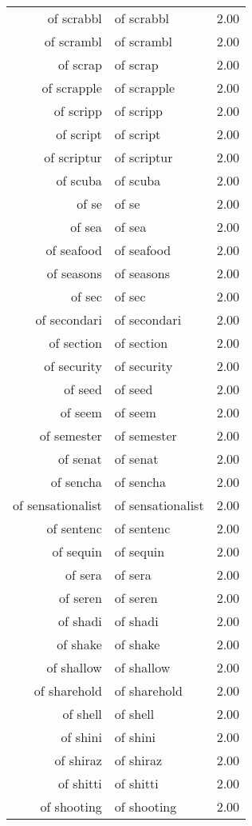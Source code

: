 \begin{table}[ht]
\begin{tabular}{rlr}
  of scrabbl & of scrabbl & 2.00 \\ 
  of scrambl & of scrambl & 2.00 \\ 
  of scrap & of scrap & 2.00 \\ 
  of scrapple & of scrapple & 2.00 \\ 
  of scripp & of scripp & 2.00 \\ 
  of script & of script & 2.00 \\ 
  of scriptur & of scriptur & 2.00 \\ 
  of scuba & of scuba & 2.00 \\ 
  of se & of se & 2.00 \\ 
  of sea & of sea & 2.00 \\ 
  of seafood & of seafood & 2.00 \\ 
  of seasons & of seasons & 2.00 \\ 
  of sec & of sec & 2.00 \\ 
  of secondari & of secondari & 2.00 \\ 
  of section & of section & 2.00 \\ 
  of security & of security & 2.00 \\ 
  of seed & of seed & 2.00 \\ 
  of seem & of seem & 2.00 \\ 
  of semester & of semester & 2.00 \\ 
  of senat & of senat & 2.00 \\ 
  of sencha & of sencha & 2.00 \\ 
  of sensationalist & of sensationalist & 2.00 \\ 
  of sentenc & of sentenc & 2.00 \\ 
  of sequin & of sequin & 2.00 \\ 
  of sera & of sera & 2.00 \\ 
  of seren & of seren & 2.00 \\ 
  of shadi & of shadi & 2.00 \\ 
  of shake & of shake & 2.00 \\ 
  of shallow & of shallow & 2.00 \\ 
  of sharehold & of sharehold & 2.00 \\ 
  of shell & of shell & 2.00 \\ 
  of shini & of shini & 2.00 \\ 
  of shiraz & of shiraz & 2.00 \\ 
  of shitti & of shitti & 2.00 \\ 
  of shooting & of shooting & 2.00 \\ 

\end{tabular}
\end{table}
